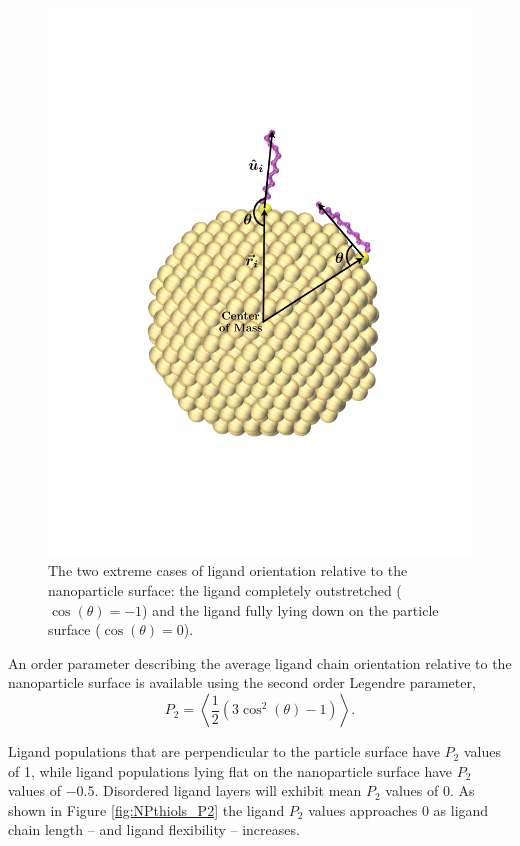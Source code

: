 \begin{figure}
  \includegraphics[width=\linewidth]{figures/NP_pAngle}
  \caption{The two extreme cases of ligand orientation relative to the
    nanoparticle surface: the ligand completely outstretched
    ($\cos{(\theta)} = -1$) and the ligand fully lying down on the
    particle surface ($\cos{(\theta)} = 0$).}
  \label{fig:NP_pAngle}
\end{figure}

An order parameter describing the average ligand chain orientation relative to
the nanoparticle surface is available using the second order Legendre
parameter,
\begin{equation}
	P_2 = \left< \frac{1}{2} \left(3\cos^2(\theta) - 1 \right) \right>.
\end{equation}

Ligand populations that are perpendicular to the particle surface have
$P_2$ values of 1, while ligand populations lying flat on the
nanoparticle surface have $P_2$ values of $-0.5$. Disordered ligand
layers will exhibit mean $P_2$ values of 0. As shown in Figure
\ref{fig:NPthiols_P2} the ligand $P_2$ values approaches 0 as
ligand chain length -- and ligand flexibility -- increases.

